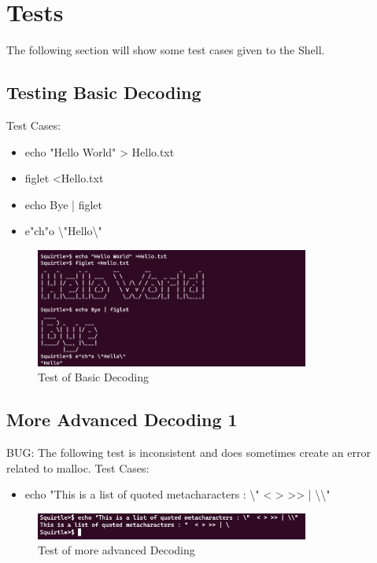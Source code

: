 \documentclass[12pt, a4paper]{report}
\begin{document}
\section{Tests}
The following section will show some test cases given to the Shell.

\subsection{Testing Basic Decoding}
Test Cases:
\begin{itemize}
  \item echo "Hello World" > Hello.txt
  \item figlet <Hello.txt
  \item echo Bye | figlet
  \item e"ch"o \textbackslash"Hello\textbackslash"
\end{itemize}
\begin{figure}[!htp]
    \centering
    \includegraphics[width=9cm]
    {Diagrams/Shell_Test_1}
    \caption{Test of Basic Decoding}
\end{figure}

\newpage

\subsection{More Advanced Decoding 1}
BUG: The following test is inconsistent and does sometimes create an error related to malloc. 
Test Cases:
\begin{itemize}
  \item echo "This is a list of quoted metacharacters : \textbackslash" < > >> | \textbackslash\textbackslash"  
\end{itemize}
\begin{figure}[!htp]
    \centering
    \includegraphics[width=9cm]
    {Diagrams/Shell_Test_2}
    \caption{Test of more advanced Decoding}
\end{figure}
\end{document}
